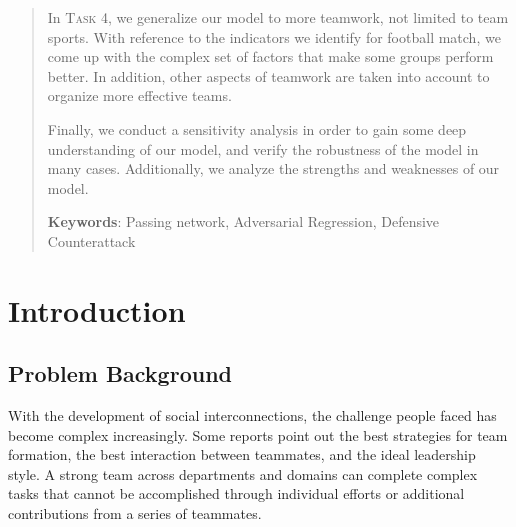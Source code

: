 \documentclass[12pt]{article}  %
\begin{document}
\begin{abstract}
In \textsc{Task 4}, we generalize our model to more teamwork, not limited to team sports. With reference to the indicators we identify for football match, we come up with the complex set of factors that make some groups perform better. In addition, other aspects of teamwork are taken into account to organize more effective teams.

Finally, we conduct a sensitivity analysis in order to gain some deep understanding of our model, and verify the robustness of the model in many cases. Additionally, we analyze the strengths and weaknesses of our model.


    





    \vspace{5pt}
    \textbf{Keywords}: Passing network, Adversarial Regression, Defensive Counterattack

\end{abstract}

\maketitle  %

\tableofcontents  %


\section{Introduction}

\subsection{Problem Background}
With the development of social interconnections, the challenge people faced has become complex increasingly. Some reports point out the best strategies for team formation, the best interaction between teammates, and the ideal leadership style. A strong team across departments and domains can complete complex tasks that cannot be accomplished through individual efforts or additional contributions from a series of teammates.
\end{document}
